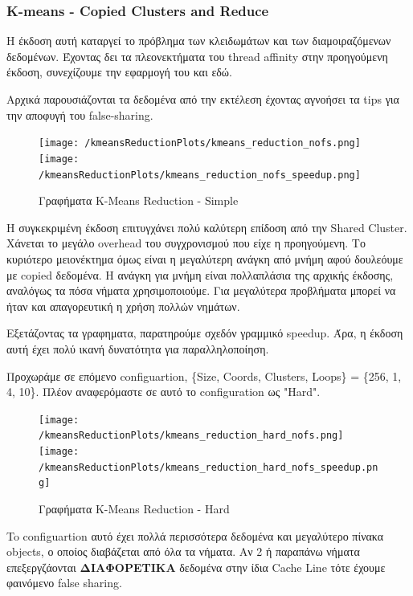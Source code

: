 \documentclass[../final_report.tex]{subfiles}
\begin{document}
\subsubsection{K-means - Copied Clusters and Reduce}

Η έκδοση αυτή καταργεί το πρόβλημα των κλειδωμάτων και των διαμοιραζόμενων δεδομένων. Έχοντας δει τα πλεονεκτήματα
του thread affinity στην προηγούμενη έκδοση, συνεχίζουμε την εφαρμογή του και εδώ.

Αρχικά παρουσιάζονται τα δεδομένα από την εκτέλεση έχοντας αγνοήσει τα tips για την αποφυγή του false-sharing.

\begin{figure}[H]
    \centering
    \texttt{[image: /kmeansReductionPlots/kmeans\_reduction\_nofs.png]}
    \texttt{[image: /kmeansReductionPlots/kmeans\_reduction\_nofs\_speedup.png]}
    \caption{Γραφήματα K-Means Reduction - Simple}
    \label{fig:Γραφήματα K-Means Reduction - Simple}
\end{figure}

Η συγκεκριμένη έκδοση επιτυγχάνει πολύ καλύτερη επίδοση από την Shared Cluster. Χάνεται το μεγάλο overhead του συγχρονισμού
που είχε η προηγούμενη. Το κυριότερο μειονέκτημα όμως είναι η μεγαλύτερη ανάγκη από μνήμη αφού δουλεόυμε με
copied δεδομένα. Η ανάγκη για μνήμη είναι πολλαπλάσια της αρχικής έκδοσης, αναλόγως τα πόσα νήματα χρησιμοποιούμε. Για
μεγαλύτερα προβλήματα μπορεί να ήταν και απαγορευτική η χρήση πολλών νημάτων. 

Εξετάζοντας τα γραφηματα, παρατηρούμε σχεδόν γραμμικό speedup. Άρα, η έκδοση αυτή έχει πολύ ικανή δυνατότητα για παραλληλοποίηση.

Προχωράμε σε επόμενο configuartion, \{Size, Coords, Clusters, Loops\} = \{256, 1, 4, 10\}. Πλέον αναφερόμαστε σε αυτό το 
configuration ως "Hard".
\vspace{4pt}

\begin{figure}[H]
    \centering
    \texttt{[image: /kmeansReductionPlots/kmeans\_reduction\_hard\_nofs.png]}
    \texttt{[image: /kmeansReductionPlots/kmeans\_reduction\_hard\_nofs\_speedup.png]}
    \caption{Γραφήματα K-Means Reduction - Hard}
    \label{fig:Γραφήματα K-Means Reduction - Hard}
\end{figure}

To configuartion αυτό έχει πολλά περισσότερα δεδομένα και μεγαλύτερο πίνακα objects, ο οποίος διαβάζεται από όλα τα νήματα.
Αν 2 ή παραπάνω νήματα επεξεργζάονται \textbf{ΔΙΑΦΟΡΕΤΙΚΑ} δεδομένα στην ίδια Cache Line τότε έχουμε φαινόμενο false sharing.
\end{document}
